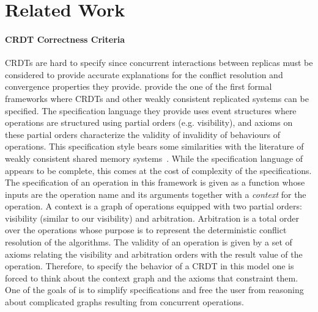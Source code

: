 \section{Related Work}
\label{sec:rel-work}

\paragraph{CRDT Correctness Criteria}
CRDTs are hard to specify since concurrent interactions between
replicas must be considered to provide accurate explanations for the
conflict resolution and convergence properties they provide.
%
\citet{BurckhardtGYZ14, Burckhardt14} provide the one of the first formal
frameworks where CRDTs and other weakly consistent replicated systems
can be specified.
%
The specification language they provide uses event structures where
operations are structured using partial orders (e.g. visibility), and
axioms on these partial orders characterize the validity of invalidity
of behaviours of operations.
%
This specification style bears some similarities with the literature
of weakly consistent shared memory systems~\cite{AlglaveMT14}.
%
While the specification language
of~\cite{BurckhardtGYZ14,Burckhardt14} appears to be complete, this
comes at the cost of complexity of the specifications.
%
The specification of an operation in this framework is given as a
function whose inputs are the operation name and its arguments
together with a \emph{context} for the operation.
%
A context is a graph of operations equipped with two partial orders:
visibility (similar to our visibility) and arbitration.
%
Arbitration is a total order over the operations whose purpose is to
represent the deterministic conflict resolution of the algorithms.
%
The validity of an operation is given by a set of axioms relating the
visibility and arbitration orders with the result value of the
operation.
%
Therefore, to specify the behavior of a CRDT in this model one is
forced to think about the context graph and the axioms that constraint
them.
%
One of the goals of \CRDTLinshort{} is to simplify specifications and
free the user from reasoning about complicated graphs resulting from
concurrent operations.

